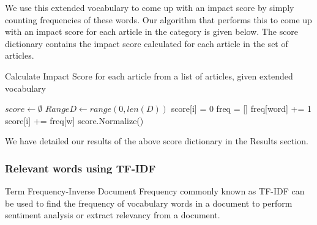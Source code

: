 \documentclass{article}
\begin{document}
We use this extended vocabulary to come up with an impact score by simply counting frequencies of these words. Our algorithm that performs this to come up with an impact score for each article in the category is given below. The score dictionary contains the impact score calculated for each article in the set of articles.

\begin {center}
\begin {algorithm}[ht]
\SetNoFillComment
\caption{Calculate Impact Score for each article from a list of articles, given extended vocabulary}
 {
    $score \gets \emptyset $\;
    $RangeD \gets range(0, len(D)) $\;
     {
    	score[i] = 0 \;
	freq = [] \;
	 {
		freq[word] += 1 \;
	}
	 {
		score[i] += freq[w] \;
	}
    }
    score.Normalize() \;
    \;
}
\end {algorithm}
\end {center}

We have detailed our results of the above score dictionary in the Results section.

\subsubsection {Relevant words using TF-IDF}

Term Frequency-Inverse Document Frequency commonly known as TF-IDF can be used to find the frequency of vocabulary words in a document to perform sentiment analysis or extract relevancy from a document.
\end{document}

